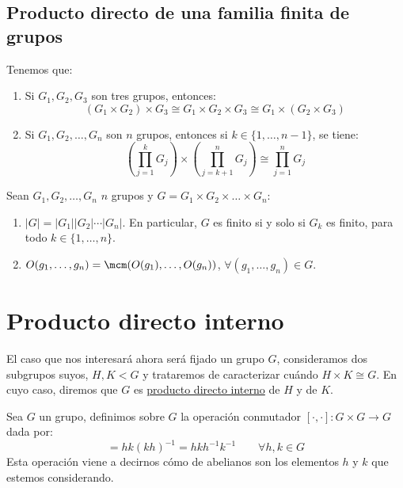 \subsection{Producto directo de una familia finita de grupos}

\begin{teo}
    Tenemos que:
    \begin{enumerate}
        \item Si $G_1,G_2,G_3$ son tres grupos, entonces:
            \begin{equation*}
                (G_1\times G_2) \times G_3 \cong G_1 \times G_2 \times G_3 \cong G_1\times (G_2\times G_3)
            \end{equation*}
        \item Si $G_1,G_2,\ldots,G_n$ son $n$ grupos, entonces si $k\in \{1,\ldots,n-1\}$, se tiene:
            \begin{equation*}
                \left(\prod_{j=1}^{k}G_j\right) \times \left(\prod_{j=k+1}^{n}G_j\right) \cong \prod_{j=1}^{n}G_j
            \end{equation*}
    \end{enumerate}
\end{teo}

\begin{teo}
    Sean $G_1,G_2,\ldots,G_n$ $n$ grupos y $G = G_1\times G_2 \times \ldots \times G_n$:
    \begin{enumerate}
        \item $|G| = |G_1| |G_2| \cdots |G_n| $. En particular, $G$ es finito si y solo si $G_k$ es finito, para todo $k\in \{1,\ldots,n\}$.
        \item $O(g_1,\ldots,g_n) = \mcm(O(g_1), \ldots, O(g_n))$, $\forall (g_1,\ldots,g_n)\in G$.
    \end{enumerate}
\end{teo}

\section{Producto directo interno}
El caso que nos interesará ahora será fijado un grupo $G$, consideramos dos subgrupos suyos, $H,K<G$ y trataremos de caracterizar cuándo $H\times K \cong G$. En cuyo caso, diremos que $G$ es \underline{producto directo interno} de $H$ y de $K$.

\begin{definicion}[Conmutador]
    Sea $G$ un grupo, definimos sobre $G$ la operación conmutador $[\cdot ,\cdot ]:G\times G \to G$ dada por:
    \begin{equation*}
        [h,k] = hk{(kh)}^{-1} = hkh^{-1}k^{-1}  \qquad \forall h,k\in G
    \end{equation*}
    Esta operación viene a decirnos cómo de abelianos son los elementos $h$ y $k$ que estemos considerando.
\end{definicion}


